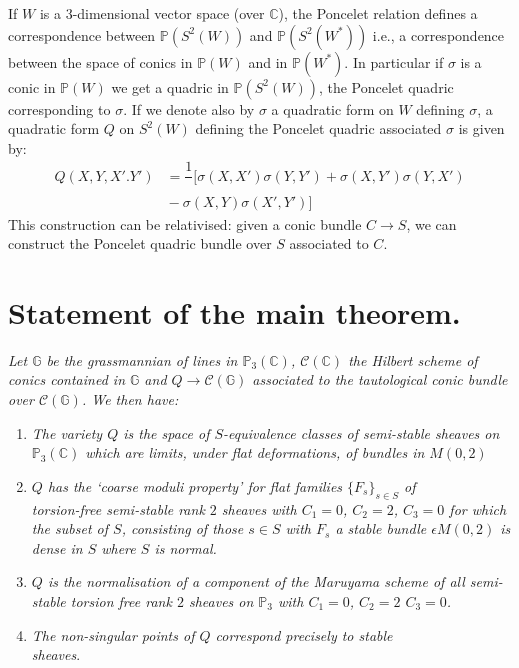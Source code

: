 If $W$ is a $3$-dimensional vector space (over $\mathbb{C}$), the
Poncelet relation defines a correspondence between
$\mathbb{P}\left(S^{2}(W)\right)$ and
$\mathbb{P}\left(S^{2}\left(W^{\ast}\right)\right)$ i.e., a
correspondence between the space of conics in $\mathbb{P}(W)$ and in
$\mathbb{P}\left(W^{\ast}\right) $. In particular if $\sigma$ is a
conic in $\mathbb{P}(W)$ we get a quadric in
$\mathbb{P}\left(S^{2}(W)\right)$, the Poncelet quadric corresponding
to $\sigma$. If we denote also by $\sigma$ a quadratic form on $W$
defining $\sigma$, a quadratic form $Q$ on $S^{2}(W)$ defining the
Poncelet quadric associated $\sigma$ is given by: 
$$
\begin{aligned}
Q(X,Y,X'.Y')&=\dfrac{1}{}[\sigma(X,X')\sigma(Y,Y')+\sigma(X,Y')\sigma(Y,X')\\
&{}-\sigma (X,Y)\sigma (X',Y')]
\end{aligned}
$$
This construction can be relativised: given a conic bundle $C\to S$,
we can construct the Poncelet quadric bundle over $S$ associated to
$C$. 

\section{Statement of the main theorem.}\label{s3}\pageoriginale


\begin{THM}
\textit{Let $\mathbb{G}$ be the grassmannian of lines in
  $\mathbb{P}_3(\mathbb{C})$, $\mathscr{C}(\mathbb{C})$ the Hilbert
  scheme of conics contained in $\mathbb{G}$ and $Q\to
  \mathscr{C}(\mathbb{G})$ associated to the tautological conic bundle
over $\mathscr{C}(\mathbb{G})$. We then have:}
\begin{enumerate}
\renewcommand{\labelenumi}{(\theenumi)}
\item \textit{The variety $Q$ is the space of $S$-equivalence classes of
  semi-stable sheaves on $\mathbb{P}_3(\mathbb{C})$ which are limits,
  under flat deformations, of bundles in $M(0,2)$ }

\item \textit{$Q$ has the `coarse moduli property' for flat families
  $\{F_s\}_{s\in S}$ of \\torsion-free semi-stable rank $2$ sheaves
  with $C_1=0$, $C_2=2$, $C_3=0$ for which the subset of $S$,
  consisting of those $s\in S$ with $F_s$ a stable bundle
  $\epsilon M(0,2)$ is dense in $S$ where $S$ is normal. }
\item \textit{$Q$ is the normalisation of a component of the Maruyama scheme
  of all semi-stable torsion free rank $2$ sheaves on $\mathbb{P}_3$
  with $C_1=0$, $C_2=2$ $C_3=0$. }
\item \textit{The non-singular points of $Q$ correspond precisely to stable
 \\sheaves}. 
\end{enumerate}
\end{THM}

